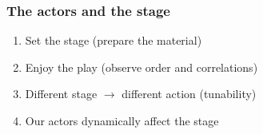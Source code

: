 \begin{frame}[label=Theatre]
\frametitle{The actors and the stage}
\centerline{}

\begin{enumerate}
\item <visible@1-> Set the stage (prepare the material)
\item <visible@2-> Enjoy the play (observe order and correlations)
\item <visible@3-> Different stage $\rightarrow$ different action (tunability)
\item <visible@4-> Our actors dynamically affect the stage
\end{enumerate}
\end{frame}










